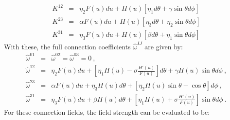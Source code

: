 \documentclass[preprint,aps,superscriptaddress,nofootinbib]{revtex4-1}
\begin{document}
\begin{eqnarray}
K^{12}&=&\eta_2 F(u)du+H(u)\left[\eta_1 d\theta+\gamma\sin\theta 
d\phi\right]\nonumber\\
K^{23}&=&\alpha F(u)du +H(u)\left[\eta_3 d\theta+\eta_2\sin\theta 
d\phi\right]\nonumber\\
K^{31}&=&\eta_3 F(u)du +H(u)\left[\beta d\theta+\eta_1\sin\theta 
d\phi\right]
\end{eqnarray}
With these, the full connection coefficients $\hat{\omega}^{IJ}$ are 
given by:
\begin{eqnarray}\label{omegafull}
\hat{\omega}^{01}&=& \hat{\omega}^{02}=\hat{\omega}^{03}=0~,\nonumber\\
\hat{\omega}^{12}&=&\eta_2 F(u)du+\left[\eta_1 H(u)-\sigma\frac{H'(u)}
{F(u)}\right]d\theta+\gamma H(u)\sin\theta d\phi~,\nonumber\\
\hat{\omega}^{23}&=&\alpha F(u)du +\eta_3 H(u) d\theta+\left[\eta_2 
H(u)\sin\theta-\cos\theta\right] d\phi~,\nonumber\\
\hat{\omega}^{31}&=&\eta_3 F(u)du +\beta H(u) d\theta+\left[\eta_1 
H(u)+\sigma\frac{H'(u)}{F(u)}\right]\sin\theta d\phi~.
\end{eqnarray}
For these connection fields, the field-strength can be evaluated to be:
\end{document}
